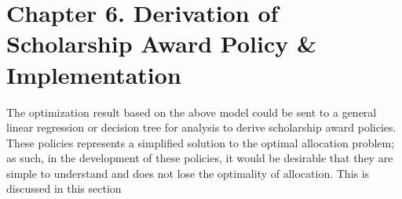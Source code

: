 \documentclass[12pt,english]{report}
\begin{document}

\chapter{Chapter 6. Derivation of Scholarship Award Policy \& Implementation}

The optimization result based on the above model could be sent to a general linear regression or decision tree for analysis to derive scholarship award policies.  These policies represents a simplified solution to the optimal allocation problem; as such, in the development of these policies, it would be desirable that they are simple to understand and does not lose the optimality of allocation. This is discussed in this section
\end{document}
